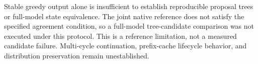 Stable greedy output alone is insufficient to establish reproducible proposal trees or full-model state equivalence. The joint native reference does not satisfy the specified agreement condition, so a full-model tree-candidate comparison was not executed under this protocol. This is a reference limitation, not a measured candidate failure. Multi-cycle continuation, prefix-cache lifecycle behavior, and distribution preservation remain unestablished.
